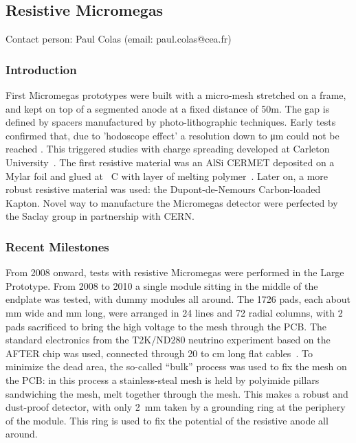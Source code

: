 \subsection{Resistive Micromegas}\label{chap:TPC_sec:micromegas}
Contact person: Paul Colas (email: paul.colas@cea.fr)\\

\subsubsection{Introduction}
First Micromegas prototypes were built with a micro-mesh stretched on a frame, and kept on top of
a segmented anode at a fixed distance of \unit{50}{\micro m}. The gap is defined by spacers manufactured
by photo-lithographic techniques. Early tests confirmed that, due to 'hodoscope effect' a resolution
down to \unit[100]{\micro m} could not be reached \cite{arog09}. This triggered studies with charge spreading
developed at Carleton University~\cite{dixit}.
The first resistive material was an AlSi CERMET deposited on a Mylar foil and glued at
\unit[90]{\textdegree C} with layer of melting polymer~\cite{fivetesla}. Later on, a more robust resistive material was
used: the Dupont-de-Nemours Carbon-loaded Kapton. Novel way to manufacture the Micromegas detector
were perfected by the Saclay group in partnership with CERN.


\subsubsection{Recent Milestones}
From 2008 onward, tests with resistive Micromegas were performed in the Large Prototype. From 2008 to 2010
a single module sitting in the middle of the endplate was tested, with dummy modules all around. The 1726 pads, each about \unit[3]{mm} wide
and \unit[7]{mm} long,
were arranged in 24 lines and 72 radial columns, with 2 pads sacrificed to bring the high voltage to the mesh
through the PCB. The standard electronics from the T2K/ND280 neutrino experiment based on the AFTER chip
was used, connected through 20 to \unit[40]{cm} long flat cables~\cite{t2kelec}.
To minimize the dead area, the so-called ``bulk'' \cite{bulk} process was used to fix the
mesh on the PCB: in this process a stainless-steal mesh is held by polyimide pillars sandwiching the mesh, melt together
through the mesh. This makes a robust and dust-proof detector, with only \SI{2}{\milli\meter} taken by a grounding ring at the periphery of the module. This ring is used to fix the potential of the resistive anode all around.

